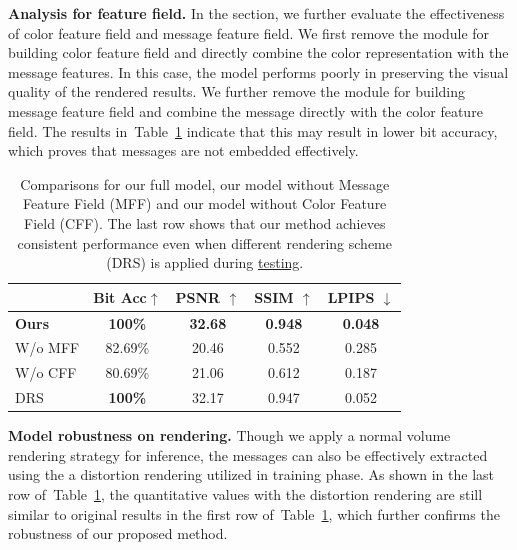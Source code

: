 \documentclass[10pt,twocolumn,letterpaper]{article}
\newcommand{\Tref}[1]{Table~\ref{#1}}
\begin{document}
\noindent\textbf{Analysis for feature field.}
\label{sec:5.3}
In the section, we further evaluate the effectiveness of color feature field and message feature field. We first remove the module for building color feature field and directly combine the color representation with the message features. In this case, the model performs poorly in preserving the visual quality of the rendered results. We further remove the module for building message feature field and combine the message directly with the color feature field. The results in~\Tref{tab:ablationstudy} indicate that this may result in lower bit accuracy, which proves that messages are not embedded effectively. 

\begin{table}[tb]
 \caption{Comparisons for our full model, our model without Message Feature Field (MFF) and our model without Color Feature Field (CFF). The last row shows that our method achieves consistent performance even when different rendering scheme (DRS) is applied during \underline{testing}. }
 \label{tab:comparison4}
 \centering
 \begin{tabular}{l|cccc}
    \toprule
         &Bit Acc$\uparrow$& PSNR $\uparrow$& SSIM $\uparrow$& LPIPS $\downarrow$ \\
    \midrule
    \textbf{Ours} & \textbf{100\%} & \textbf{32.68} & \textbf{0.948} & \textbf{0.048}  \\
    W/o MFF& 82.69\% & 20.46 & 0.552 & 0.285     \\
    W/o CFF& 80.69\% & 21.06 & 0.612 & 0.187     \\
    DRS  & \textbf{100\%}  & 32.17 & 0.947 & 0.052   \\
    \bottomrule
\end{tabular}
\label{tab:ablationstudy}
      \vspace{-12pt}
 \end{table}
\noindent\textbf{Model robustness on rendering.}
Though we apply a normal volume rendering strategy for inference, the messages can also be effectively extracted using the a distortion rendering utilized in training phase. As shown in the last row of~\Tref{tab:ablationstudy}, the quantitative values with the distortion rendering are still similar to original results in the first row of~\Tref{tab:ablationstudy}, which further confirms the robustness of our proposed method.
\end{document}

